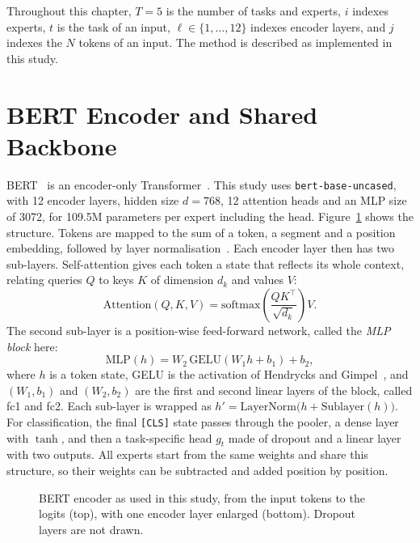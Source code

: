 Throughout this chapter, $T=5$ is the number of tasks and experts, $i$ indexes experts, $t$ is the task of an input, $\ell\in\{1,\dots,12\}$ indexes encoder layers, and $j$ indexes the $N$ tokens of an input. The method is described as implemented in this study.

\section{BERT Encoder and Shared Backbone}

BERT~\cite{devlin2019bert} is an encoder-only Transformer~\cite{vaswani2017attention}. This study uses \texttt{bert-base-uncased}, with 12 encoder layers, hidden size $d=768$, 12 attention heads and an MLP size of 3072, for 109.5M parameters per expert including the head. Figure~\ref{fig:bert} shows the structure. Tokens are mapped to the sum of a token, a segment and a position embedding, followed by layer normalisation~\cite{ba2016layernorm}. Each encoder layer then has two sub-layers. Self-attention gives each token a state that reflects its whole context, relating queries $Q$ to keys $K$ of dimension $d_k$ and values $V$:
\begin{equation}
\mathrm{Attention}(Q,K,V)=\mathrm{softmax}\!\left(\frac{QK^{\top}}{\sqrt{d_k}}\right)V .
\label{eq:attention}
\end{equation}
The second sub-layer is a position-wise feed-forward network, called the \emph{MLP block} here:
\begin{equation}
\mathrm{MLP}(h)=W_2\,\mathrm{GELU}(W_1h+b_1)+b_2 ,
\label{eq:ffn}
\end{equation}
where $h$ is a token state, GELU is the activation of Hendrycks and Gimpel~\cite{hendrycks2016gelu}, and $(W_1,b_1)$ and $(W_2,b_2)$ are the first and second linear layers of the block, called fc1 and fc2. Each sub-layer is wrapped as $h'=\mathrm{LayerNorm}\big(h+\mathrm{Sublayer}(h)\big)$. For classification, the final \texttt{[CLS]} state passes through the pooler, a dense layer with $\tanh$, and then a task-specific head $g_t$ made of dropout and a linear layer with two outputs. All experts start from the same weights and share this structure, so their weights can be subtracted and added position by position.

\begin{figure}[htbp]
  \centering
  \resizebox{.82\linewidth}{!}{}
  \caption{BERT encoder as used in this study, from the input tokens to the logits (top), with one encoder layer enlarged (bottom). Dropout layers are not drawn.}
  \label{fig:bert}
\end{figure}

